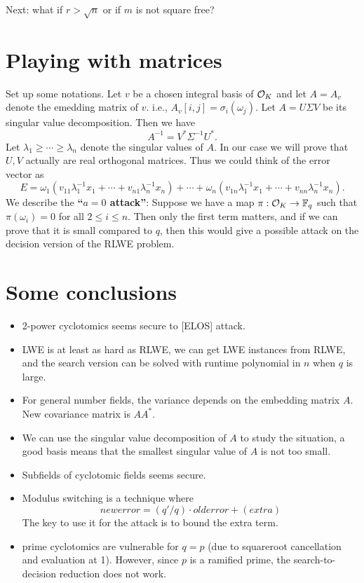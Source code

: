 \documentclass{amsart}
\begin{document}
Next: what if $r > \sqrt{n}$ or if $m$ is not square free?


\section{Playing with matrices}

Set up some notations. Let $v$ be a chosen integral basis of $\mathcal{O}_K$ and let $A = A_v$ denote the emedding matrix of $v$. i.e., $A_v[i,j] = \sigma_i(\omega_j)$. Let $A = U \Sigma V$
be its singular value decomposition. Then we have
\[
    A^{-1} = V^* \Sigma^{-1} U^*.
\]
Let $\lambda_1 \geq \cdots \geq \lambda_n$ denote the singular values of $A$. In our case we will prove that
$U,V$ actually are real orthogonal matrices.
Thus we could think of the error vector as
\[
    E = \omega_1 (v_{11} \lambda_1^{-1}x_1 + \cdots + v_{n1} \lambda_n^{-1}x_n) + \cdots + \omega_n (v_{1n} \lambda_1^{-1} x_1+ \cdots + v_{nn} \lambda_n^{-1}x_n).
\]
We describe the {\bf ``$a = 0$ attack''}: Suppose we have a map $\pi: \mathcal{O}_K \to \mathbb{F}_q$ such that $\pi(\omega_i) = 0$ for all $2 \leq i \leq n$. Then only the first term matters, and if we can prove that it is small compared to $q$, then this would give a possible attack on the decision version of the RLWE problem.




\section{Some conclusions}

\begin{itemize}
\item 2-power cyclotomics seems secure to [ELOS] attack.
\item LWE is at least as hard as RLWE, we can get LWE instances from RLWE, and the search version can be solved with runtime polynomial in $n$ when $q$ is large.
\item For general number fields, the variance depends on the embedding matrix $A$. New covariance matrix is $AA^*$.
\item We can use the singular value decomposition of $A$
to study the situation, a good basis means that the smallest singular value of $A$ is not too small.
\item Subfields of cyclotomic fields seems secure.
\item Modulus switching is a technique where $$newerror = (q'/q) \cdot old error + (extra)$$ The key to use it for the attack is to bound the extra term.
\item prime cyclotomics are vulnerable for $q = p$ (due to squareroot cancellation and evaluation at 1). However, since $p$ is a ramified prime, the search-to-decision reduction does not work.
\end{itemize}
\end{document}
